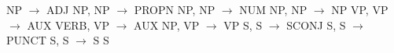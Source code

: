 NP $\to$ ADJ NP, NP $\to$ PROPN NP, NP $\to$ NUM NP, NP $\to$ NP VP, VP $\to$ AUX VERB, VP $\to$ AUX NP, VP $\to$ VP S, S $\to$ SCONJ S, S $\to$ PUNCT S, S $\to$ S S